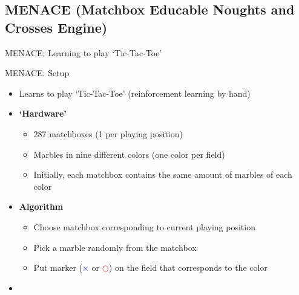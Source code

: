 \subsection{MENACE (Matchbox Educable Noughts and Crosses Engine)}

\begin{frame}{MENACE: Learning to play `Tic-Tac-Toe'}{}
\end{frame}


\begin{frame}{MENACE: Setup}{}
	\begin{itemize}
		\item Learns to play `Tic-Tac-Toe' (reinforcement learning by hand)
		\item \textbf{`Hardware'}
		\begin{itemize}
			\item 287 matchboxes (1 per playing position)
			\item Marbles in nine different colors (one color per field)
			\item Initially, each matchbox contains the same amount of marbles of each color
		\end{itemize}
		\item \textbf{Algorithm}
		\begin{itemize}
			\item Choose matchbox corresponding to current playing position
			\item Pick a marble randomly from the matchbox
			\item Put marker (\textcolor{blue}{$\bm{\times}$} or \textcolor{red}{$\bm{\bigcirc}$})
				on the field that corresponds to the color
		\end{itemize}
		\item {}
	\end{itemize}
\end{frame}


